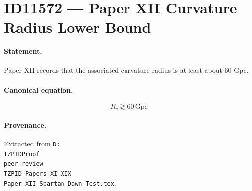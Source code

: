 \section*{ID11572 --- Paper XII Curvature Radius Lower Bound}

\paragraph{Statement.}
Paper XII records that the associated curvature radius is at least about 60 Gpc.

\paragraph{Canonical equation.}
\[
R_c\gtrsim60\,\mathrm{Gpc}
\]

\paragraph{Provenance.}
Extracted from \texttt{D:\\TZPIDProof\\peer\_review\\TZPID\_Papers\_XI\_XIX\\Paper\_XII\_Spartan\_Dawn\_Test.tex}.

